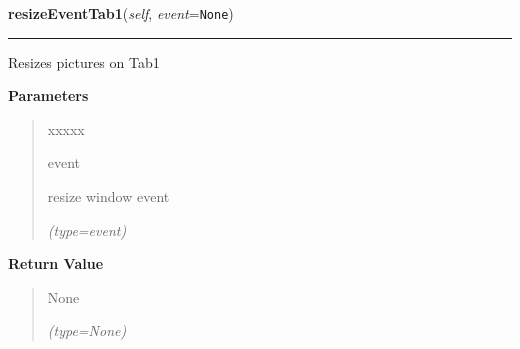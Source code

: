 \hspace{.8\funcindent}\begin{boxedminipage}{\funcwidth}

    \raggedright \textbf{resizeEventTab1}(\textit{self}, \textit{event}={\tt None})

    \vspace{-1.5ex}

    \rule{\textwidth}{0.5\fboxrule}
\setlength{\parskip}{2ex}
    Resizes pictures on Tab1

\setlength{\parskip}{1ex}
      \textbf{Parameters}
      \vspace{-1ex}

      \begin{quote}
        \begin{Ventry}{xxxxx}

          \item[event]

          resize window event

            {\it (type=event)}

        \end{Ventry}

      \end{quote}

      \textbf{Return Value}
    \vspace{-1ex}

      \begin{quote}
      None

      {\it (type=None)}

      \end{quote}

    \end{boxedminipage}

    \label{client_gui:GuiClass:resizeEventTab2}

    \vspace{0.5ex}

